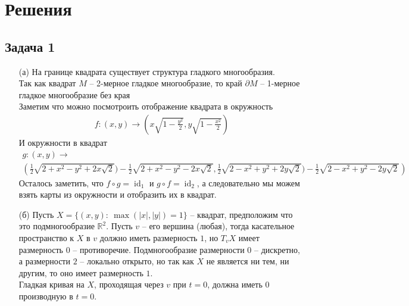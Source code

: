 
\newpage
\section*{Решения}
\subsection*{Задача 1}
\begin{enumerate}
\item[(а)]
	На границе квадрата существует структура гладкого многообразия.\\
	Так как квадрат $M$ -- 2-мерное гладкое многообразие, то край $\partial M$ -- 1-мерное гладкое многообразие без края\\
	Заметим что можно посмотроить отображение квадрата в окружность
	\begin{gather*}
		f: (x,y) \to \left(x \sqrt{1 - \frac{y^2}{2}}, y \sqrt{1 - \frac{x^2}{2}}\right)
	\end{gather*}
	И окружности в квадрат
	\begin{gather*}
		g: (x,y) \to \\
		\left(\frac{1}{2}\sqrt{2+x^2 - y^2 + 2x\sqrt{2}}) - \frac{1}{2}\sqrt{2 + x^2 - y^2 - 2x\sqrt{2}}, \frac{1}{2}\sqrt{2-x^2 + y^2 + 2y\sqrt{2}}) - \frac{1}{2}\sqrt{2 - x^2 + y^2 - 2y\sqrt{2}}\right)
	\end{gather*}
	Осталось заметить, что $f \circ g = \operatorname{id}_1$ и $g \circ f = \operatorname{id}_2$, а следовательно мы можем взять карты из окружности и отобразить их в квадрат.
\item[(б)]
	Пусть $X = \{(x,y):\ \max(|x|,|y|) = 1\}$ -- квадрат, предположим что это подмногообразие $\mathbb{R}^2$. Пусть $v$ -- его вершина (любая), тогда касательное пространство к $X$ в $v$ должно иметь размерность $1$, но $T_v X$ имеет размерность $0$ -- противоречие.
	\vskip 0.1in
	Подмногообразие размерности $0$ -- дискретно, а размерности $2$ -- локально открыто, но так как $X$ не является ни тем, ни другим, то оно имеет размерность $1$.\\
	Гладкая кривая на $X$, проходящая через $v$ при $t = 0$, должна иметь $0$ производную в $t = 0.$
\end{enumerate}


